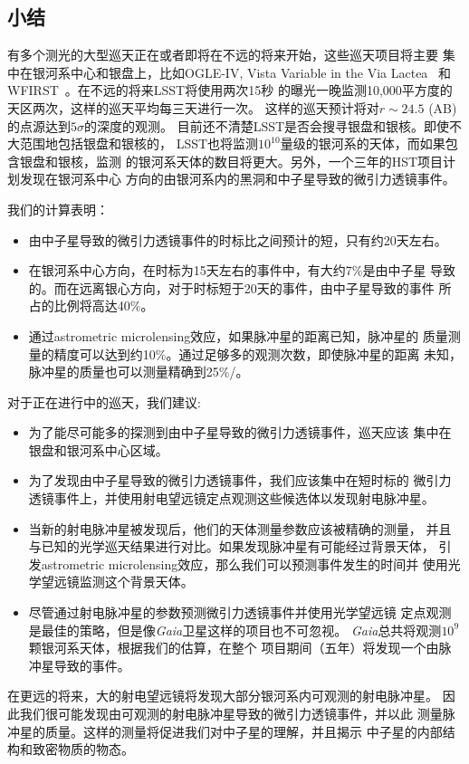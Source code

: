 \subsection{小结}

有多个测光的大型巡天正在或者即将在不远的将来开始，这些巡天项目将主要
集中在银河系中心和银盘上，比如OGLE-IV, Vista Variable in the Via Lactea~\supercite{Minniti} 
和WFIRST~\supercite{Spergel}。在不远的将来LSST\supercite{ivez}将使用两次15秒
的曝光一晚监测10,000平方度的天区两次，这样的巡天平均每三天进行一次。
这样的巡天预计将对$r\sim24.5$ (AB)的点源达到$5\sigma$的深度的观测。
目前还不清楚LSST是否会搜寻银盘和银核。即使不大范围地包括银盘和银核的，
LSST也将监测$10^{10}$量级的银河系的天体，而如果包含银盘和银核，监测
的银河系天体的数目将更大。另外，一个三年的HST项目计划发现在银河系中心
方向的由银河系内的黑洞和中子星导致的微引力透镜事件\supercite{sahu}。

我们的计算表明：
\begin{itemize}
\item 由中子星导致的微引力透镜事件的时标比之间预计的短，只有约20天左右。
\item 在银河系中心方向，在时标为15天左右的事件中，有大约7\%是由中子星
导致的。而在远离银心方向，对于时标短于20天的事件，由中子星导致的事件
所占的比例将高达40\%。
\item 通过astrometric microlensing效应，如果脉冲星的距离已知，脉冲星的
质量测量的精度可以达到约10\%。通过足够多的观测次数，即使脉冲星的距离
未知，脉冲星的质量也可以测量精确到25\%/。
\end{itemize}

对于正在进行中的巡天，我们建议:
\begin{itemize}
\item 为了能尽可能多的探测到由中子星导致的微引力透镜事件，巡天应该
集中在银盘和银河系中心区域。
\item 为了发现由中子星导致的微引力透镜事件，我们应该集中在短时标的
微引力透镜事件上，并使用射电望远镜定点观测这些候选体以发现射电脉冲星。
\item 当新的射电脉冲星被发现后，他们的天体测量参数应该被精确的测量，
并且与已知的光学巡天结果进行对比。如果发现脉冲星有可能经过背景天体，
引发astrometric microlensing效应，那么我们可以预测事件发生的时间并
使用光学望远镜监测这个背景天体。
\item 尽管通过射电脉冲星的参数预测微引力透镜事件并使用光学望远镜
定点观测是最佳的策略，但是像\textit{Gaia}卫星这样的项目也不可忽视。
\textit{Gaia}总共将观测$10^9$颗银河系天体，根据我们的估算，在整个
项目期间（五年）将发现一个由脉冲星导致的事件。
\end{itemize}

在更远的将来，大的射电望远镜将发现大部分银河系内可观测的射电脉冲星。
因此我们很可能发现由可观测的射电脉冲星导致的微引力透镜事件，并以此
测量脉冲星的质量。这样的测量将促进我们对中子星的理解，并且揭示
中子星的内部结构和致密物质的物态。

\pkuthssffaq

